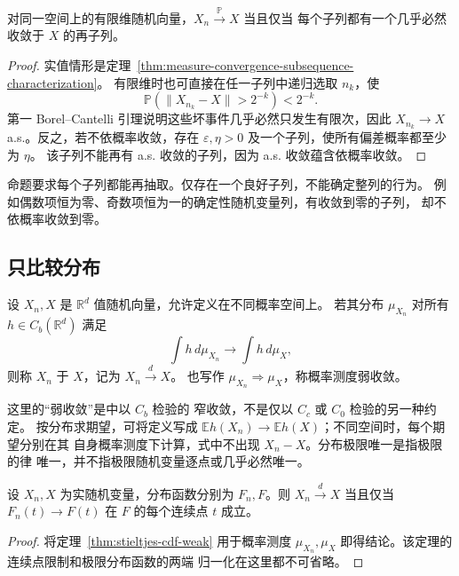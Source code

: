 \begin{proposition}[概率收敛的子列刻画]
\label{prop:probability-subsequence-characterization}
对同一空间上的有限维随机向量，$X_n\xrightarrow{\mathbb P}X$ 当且仅当
每个子列都有一个几乎必然收敛于 $X$ 的再子列。
\end{proposition}

\begin{proof}
实值情形是定理~\ref{thm:measure-convergence-subsequence-characterization}。
有限维时也可直接在任一子列中递归选取 $n_k$，使
\[
 \mathbb P(\|X_{n_k}-X\|>2^{-k})<2^{-k}.
\]
第一 Borel--Cantelli 引理说明这些坏事件几乎必然只发生有限次，因此
$X_{n_k}\to X$ a.s.。反之，若不依概率收敛，存在
$\varepsilon,\eta>0$ 及一个子列，使所有偏差概率都至少为 $\eta$。
该子列不能再有 a.s. 收敛的子列，因为 a.s. 收敛蕴含依概率收敛。
\end{proof}

命题要求每个子列都能再抽取。仅存在一个良好子列，不能确定整列的行为。
例如偶数项恒为零、奇数项恒为一的确定性随机变量列，有收敛到零的子列，
却不依概率收敛到零。

\subsection{只比较分布}

\begin{definition}
\label{def:convergence-in-distribution}
设 $X_n,X$ 是 $\mathbb R^d$ 值随机向量，允许定义在不同概率空间上。
若其分布 $\mu_{X_n}$ 对所有 $h\in C_b(\mathbb R^d)$ 满足
\[
 \int h\,d\mu_{X_n}\longrightarrow\int h\,d\mu_X,
\]
则称 $X_n$ 于 $X$，记为 $X_n\xrightarrow{d}X$。
也写作 $\mu_{X_n}\Rightarrow\mu_X$，称概率测度弱收敛。
\end{definition}

这里的“弱收敛”是中以 $C_b$ 检验的
窄收敛，不是仅以 $C_c$ 或 $C_0$ 检验的另一种约定。
按分布求期望，可将定义写成
$\mathbb E h(X_n)\to\mathbb E h(X)$；不同空间时，每个期望分别在其
自身概率测度下计算，式中不出现 $X_n-X$。分布极限唯一是指极限的律
唯一，并不指极限随机变量逐点或几乎必然唯一。

\begin{proposition}[实线上的分布函数判别]
\label{prop:probability-cdf-convergence}
设 $X_n,X$ 为实随机变量，分布函数分别为 $F_n,F$。则
$X_n\xrightarrow dX$ 当且仅当
$F_n(t)\to F(t)$ 在 $F$ 的每个连续点 $t$ 成立。
\end{proposition}

\begin{proof}
将定理~\ref{thm:stieltjes-cdf-weak} 用于概率测度
$\mu_{X_n},\mu_X$ 即得结论。该定理的连续点限制和极限分布函数的两端
归一化在这里都不可省略。
\end{proof}

